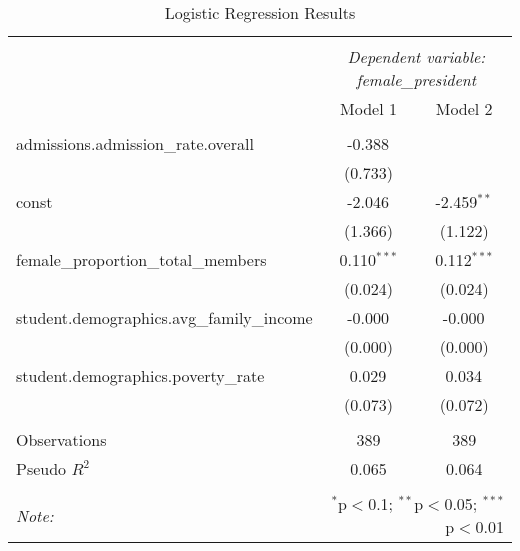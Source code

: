 \begin{table}[!htbp] \centering
  \caption{Logistic Regression Results}
\begin{tabular}{@{\extracolsep{5pt}}lcc}
\\[-1.8ex]\hline
\hline \\[-1.8ex]
& \multicolumn{2}{c}{\textit{Dependent variable: female_president}} \
\cr \cline{2-3}
\\[-1.8ex] & \multicolumn{1}{c}{Model 1} & \multicolumn{1}{c}{Model 2}  \\
\hline \\[-1.8ex]
 admissions.admission_rate.overall & -0.388$^{}$ & \\
& (0.733) & \\
 const & -2.046$^{}$ & -2.459$^{**}$ \\
& (1.366) & (1.122) \\
 female_proportion_total_members & 0.110$^{***}$ & 0.112$^{***}$ \\
& (0.024) & (0.024) \\
 student.demographics.avg_family_income & -0.000$^{}$ & -0.000$^{}$ \\
& (0.000) & (0.000) \\
 student.demographics.poverty_rate & 0.029$^{}$ & 0.034$^{}$ \\
& (0.073) & (0.072) \\
\hline \\[-1.8ex]
 Observations & 389 & 389 \\
 Pseudo $R^2$ & 0.065 & 0.064 \\
\hline
\hline \\[-1.8ex]
\textit{Note:} & \multicolumn{2}{r}{$^{*}$p$<$0.1; $^{**}$p$<$0.05; $^{***}$p$<$0.01} \\
\end{tabular}
\end{table}